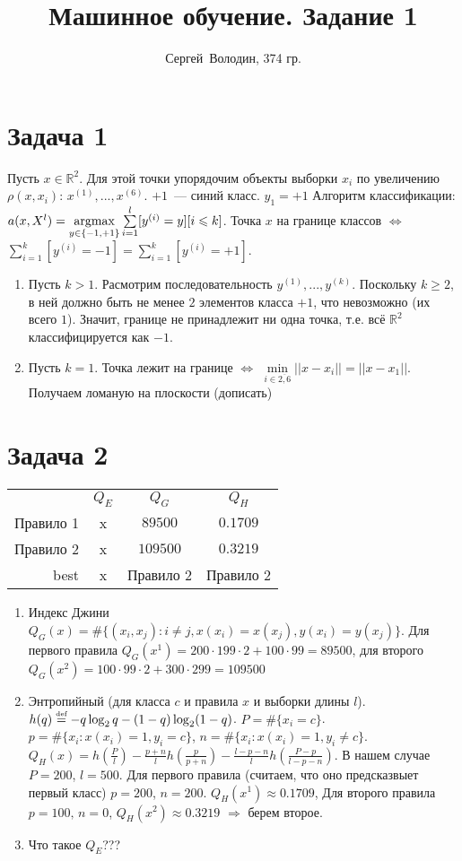 \documentclass[a4paper]{article}
\title{Машинное обучение. Задание 1}
\author{Сергей~Володин, 374 гр.}
\def\eqdef{\overset{\mbox{\tiny def}}{=}}
\newcommand\argmax{\operatornamewithlimits{argmax}\limits}
\begin{document}
\maketitle
\section*{Задача 1}
Пусть $x\in\mathbb{R}^2$. Для этой точки упорядочим объекты выборки $x_i$ по увеличению $\rho(x,x_i)$: $x^{(1)}, ..., x^{(6)}$. $+1$~--- синий класс. $y_1=+1$ Алгоритм 
классификации: $a(x,X^l)=\argmax_{y\in\{-1,+1\}}\sum\limits_{i=1}^l[y^{(i)}=y][i\leqslant k]$. Точка $x$ на границе классов $\Leftrightarrow$ $\sum\limits_{i=1}^k[y^{(i)}=-1]=\sum\limits_{i=1}^k[y^{(i)}=+1]$.
\begin{enumerate}
\item Пусть $k>1$. Расмотрим последовательность $y^{(1)},...,y^{(k)}$.
Поскольку $k\geqslant 2$, в ней должно быть не менее $2$ элементов класса $+1$, что невозможно (их всего $1$). Значит, границе не принадлежит ни одна точка, т.е. всё $\mathbb{R}^2$ классифицируется как $-1$.
\item Пусть $k=1$. Точка лежит на границе $\Leftrightarrow$ $\min\limits_{i\in\overline{2,6}}||x-x_i||=||x-x_1||$. Получаем ломаную на плоскости (дописать)
\end{enumerate}
\section*{Задача 2}
\begin{tabular}{rccc}
 &  $Q_E$ & $Q_G$ & $Q_H$\\
Правило 1 & x &  $89500$ & $0.1709$ \\
Правило 2 & x & $109500$ & $0.3219$ \\
best & x & Правило 2 & Правило 2 \\
\end{tabular}
\begin{enumerate}
\item Индекс Джини $Q_G(x)=\#\{(x_i,x_j)\colon i\neq j, x(x_i)=x(x_j), y(x_i)=y(x_j)\}$. Для первого правила $Q_G(x^1)=200\cdot 199\cdot 2+100\cdot 99=89500$, для второго $Q_G(x^2)=100\cdot 99\cdot 2+300\cdot 299=109500$
\item Энтропийный (для класса $c$ и правила $x$ и выборки длины $l$). $h(q)\eqdef -q\log_2 q-(1-q)\log_2 (1-q)$. $P=\#\{x_i=c\}$. $p=\#\{x_i\colon x(x_i)=1, y_i=c\}$, $n=\#\{x_i\colon x(x_i)=1, y_i\neq c\}$. $Q_H(x)=h(\frac{P}{l})-\frac{p+n}{l}h(\frac{p}{p+n})-\frac{l-p-n}{l}h(\frac{P-p}{l-p-n})$. В нашем случае $P=200$, $l=500$. Для первого правила (считаем, что оно предсказвыет первый класс) $p=200$, $n=200$. $Q_H(x^1)\approx 0.1709$, Для второго правила $p=100,\,n=0$, $Q_H(x^2)\approx 0.3219$ $\Rightarrow$ берем второе.
\item Что такое $Q_E$???
\end{enumerate}
\end{document}
